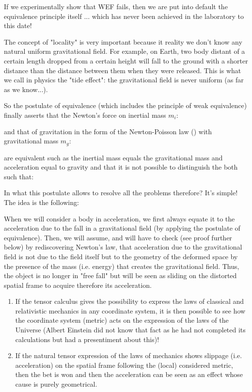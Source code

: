 	If we experimentally show that WEF fails, then we are put into default the equivalence principle itself ... which has never been achieved in the laboratory to this date!
	
	\begin{tcolorbox}[title=Remark,colframe=black,arc=10pt]
	The concept of "locality" is very important because it reality we don't know any natural uniform gravitational field. For example, on Earth, two body distant of a certain length dropped from a certain height will fall to the ground with a shorter distance than the distance between them when they were released. This is what we call in physics the "tide effect": the gravitational field is never uniform (as far as we know...).
	\end{tcolorbox}
	
	So the postulate of equivalence (which includes the principle of weak equivalence) finally asserts that the Newton's force on inertial mass $m_i$:
	
	and that of gravitation in the form of the Newton-Poisson law () with gravitational mass $m_g$:
	
	are equivalent such as the inertial mass equals the gravitational mass and acceleration equal to gravity and that it is not possible to distinguish the both such that:
	
	In what this postulate allows to resolve all the problems therefore? It's simple! The idea is the following:
	
	When we will consider a body in acceleration, we first always equate it to the acceleration due to the fall in a gravitational field (by applying the postulate of equivalence). Then, we will assume, and will have to check (see proof further below) by rediscovering Newton's law, that acceleration due to the gravitational field is not due to the field itself but to the geometry of the deformed space by the presence of the mass (i.e. energy) that creates the gravitational field. Thus, the object is no longer in "free fall" but will be seen as sliding on the distorted spatial frame to acquire therefore its acceleration.
	\begin{enumerate}
		\item If the tensor calculus gives the possibility to express the laws of classical and relativistic mechanics in any coordinate system, it is then possible to see how the coordinate system (metric) acts on the expression of the laws of the Universe (Albert Einstein did not know that fact as he had not completed its calculations but had a presentiment about this)!
		\item If the natural tensor expression of the laws of mechanics shows slippage (i.e. acceleration) on the spatial frame following the (local) considered metric, then the bet is won and then the acceleration can be seen as an effect whose cause is purely geometrical.
	\end{enumerate}
	
